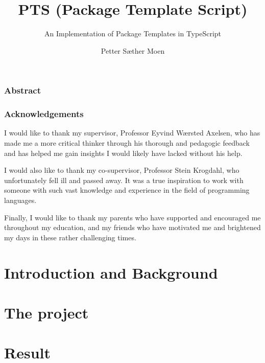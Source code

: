 \documentclass[UKenglish]{ifimaster}
\title{PTS (Package Template Script)}
\subtitle{An Implementation of Package Templates in TypeScript}
\author{Petter Sæther Moen}
\begin{document}


\duoforside[dept={Department of Informatics},
  program={Informatics: Programming and System Architecture},
  long]

\frontmatter{}

\clearpage
\section*{Abstract}

\cleardoublepage

\section*{Acknowledgements}

I would like to thank my supervisor, Professor Eyvind Wærsted Axelsen, who has made me a more critical thinker through his thorough and pedagogic feedback and has helped me gain insights I would likely have lacked without his help.

I would also like to thank my co-supervisor, Professor Stein Krogdahl, who unfortunately fell ill and passed away.
It was a true inspiration to work with someone with such vast knowledge and experience in the field of programming languages.

Finally, I would like to thank my parents who have supported and encouraged me throughout my education, and my friends who have motivated me and brightened my days in these rather challenging times.

\hypersetup{linkcolor=black}

\tableofcontents{}
\listoflistings{}



\cleardoublepage

\hypersetup{linkcolor=blue}

\mainmatter{}


\part{Introduction and Background}\label{part:introduction}





\part{The project}\label{part:the-project}







\part{Result}\label{part:Results}






\backmatter{}
\printbibliography
\end{document}
